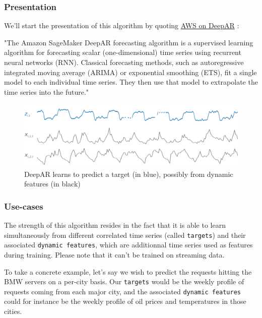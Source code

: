 \subsubsection{Presentation}
\label{ch:deepar}
We'll start the presentation of this algorithm by quoting \href{https://docs.aws.amazon.com/sagemaker/latest/dg/deepar.html}{AWS on DeepAR}  \cite{awsdeepar}:
\begin{displayquote}
"The Amazon SageMaker DeepAR forecasting algorithm is a supervised learning algorithm for forecasting scalar (one-dimensional) time series using recurrent neural networks (RNN). Classical forecasting methods, such as autoregressive integrated moving average (ARIMA) or exponential smoothing (ETS), fit a single model to each individual time series. They then use that model to extrapolate the time series into the future."
\end{displayquote}

\begin{figure}[h!]
    \centering
    \includegraphics[width=1\textwidth]{images/deepar-explanation.png}
    \caption{DeepAR learns to predict a target (in blue), possibly from dynamic features (in black)}
    \label{fig:deepar-explanation}
\end{figure}


\subsubsection{Use-cases}

The strength of this algorithm resides in the fact that it is able to learn simultaneously from different correlated time series (called \lstinline{targets}) and their associated \lstinline{dynamic features}, which are additionnal time series used as features during training. Please note that it can't be trained on streaming data.

To take a concrete example, let's say we wish to predict the requests hitting the BMW servers on a per-city basis. Our \lstinline{targets} would be the weekly profile of requests coming from each major city, and the associated \lstinline{dynamic features} could for instance be the weekly profile of oil prices and temperatures in those cities.

